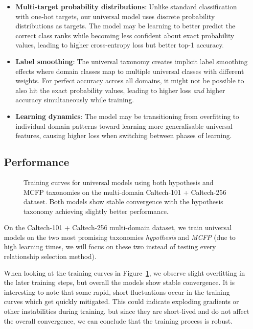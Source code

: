 \begin{itemize}
      \item \textbf{Multi-target probability distributions}: Unlike standard classification with one-hot targets,
            our universal model uses discrete probability distributions as targets.
            The model may be learning to better predict the correct class ranks while becoming less confident about exact probability values,
            leading to higher cross-entropy loss but better top-1 accuracy.
      \item \textbf{Label smoothing}: The universal taxonomy creates implicit
            label smoothing effects where domain classes map to multiple universal classes
            with different weights.
            For perfect accuracy across all domains, it might not be possible to also hit
            the exact probability values, leading to higher loss \textit{and} higher accuracy simultaneously
            while training.
      \item \textbf{Learning dynamics}: The model may be transitioning
            from overfitting to individual domain patterns toward learning more generalisable
            universal features, causing higher loss when switching between phases of learning.
\end{itemize}

\subsection{Performance}



\begin{figure}[ht]
      \centering
      \scalebox{0.35}{}
      \caption{Training curves for universal models using both hypothesis and MCFP taxonomies on the multi-domain Caltech-101 + Caltech-256 dataset. Both models show stable convergence with the hypothesis taxonomy achieving slightly better performance.}
      \label{fig:universal_model_training_curves}
\end{figure}

On the Caltech-101 + Caltech-256 multi-domain dataset,
we train universal models on the two most promising taxonomies \textit{hypothesis} and \textit{MCFP}
(due to high learning times, we will focus on these two instead of testing every relationship selection method).

When looking at the training curves in Figure~\ref{fig:universal_model_training_curves},
we observe slight overfitting in the later training steps,
but overall the models show stable convergence.
It is interesting to note that some rapid, short fluctuations occur in the training curves
which get quickly mitigated.
This could indicate exploding gradients or other instabilities during training,
but since they are short-lived and do not affect the overall convergence,
we can conclude that the training process is robust.

